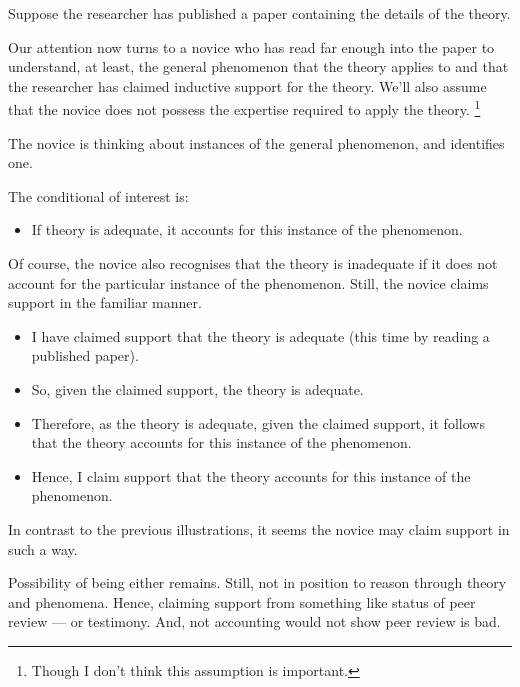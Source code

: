 \begin{note}
  \begin{illustration}\label{ill:CE:testimony}
    Suppose the researcher has published a paper containing the details of the theory.

    Our attention now turns to a novice who has read far enough into the paper to understand, at least, the general phenomenon that the theory applies to and that the researcher has claimed inductive support for the theory.
    We'll also assume that the novice does not possess the expertise required to apply the theory.\nolinebreak
    \footnote{
      Though I don't think this assumption is important.
    }

    The novice is thinking about instances of the general phenomenon, and identifies one.

    The conditional of interest is:
    \begin{itemize}
    \item If theory is adequate, it accounts for this instance of the phenomenon.
    \end{itemize}

    Of course, the novice also recognises that the theory is inadequate if it  does not account for the particular instance of the phenomenon.
    Still, the novice claims support in the familiar manner.

    \begin{itemize}
    \item I have claimed support that the theory is adequate (this time by reading a published paper).
    \item So, given the claimed support, the theory is adequate.
    \item Therefore, as the theory is adequate, given the claimed support, it follows that the theory accounts for this instance of the phenomenon.
    \item Hence, I claim support that the theory accounts for this instance of the phenomenon.
    \end{itemize}
  \end{illustration}

  In contrast to the previous illustrations, it seems the novice may claim support in such a way.

  Possibility of being either \mom{} remains.
  Still, not in position to reason through theory and phenomena.
  Hence, claiming support from something like status of peer review --- or testimony.
  And, not accounting would not show peer review is bad.
\end{note}

